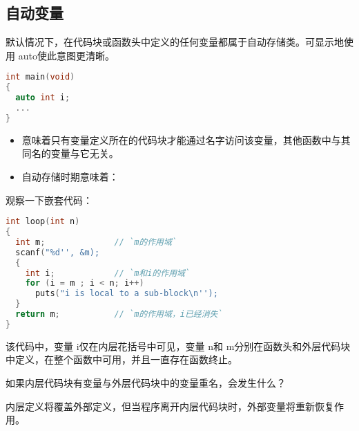 \subsection{自动变量}
\begin{frame}[fragile]\ft{\subsecname}
默认情况下，在代码块或函数头中定义的任何变量都属于自动存储类。可显示地使用{ auto}使此意图更清晰。
\begin{lstlisting}[language=c,frame=single]
int main(void)
{
  auto int i;
  ...
}  
\end{lstlisting}
\end{frame}

\begin{frame}[fragile]\ft{\subsecname}
  \begin{itemize}
  \item {}意味着只有变量定义所在的代码块才能通过名字访问该变量，其他函数中与其同名的变量与它无关。\\[0.1in]
  \item 自动存储时期意味着：
  \end{itemize}
\end{frame}

\begin{frame}[fragile]\ft{\subsecname}
观察一下嵌套代码：
\begin{lstlisting}[language=c,frame=single]
int loop(int n)
{
  int m;              // `m的作用域`
  scanf("%d'', &m);
  {
    int i;            // `m和i的作用域`
    for (i = m ; i < n; i++)
      puts("i is local to a sub-block\n'');
  }
  return m;           // `m的作用域，i已经消失`
}  
\end{lstlisting}
\end{frame}

\begin{frame}[fragile]\ft{\subsecname}
该代码中，变量{ i}仅在内层花括号中可见，变量{ n}和{ m}分别在函数头和外层代码块中定义，在整个函数中可用，并且一直存在函数终止。
\end{frame}

\begin{frame}[fragile]\ft{\subsecname}
  \begin{wenti}
    如果内层代码块有变量与外层代码块中的变量重名，会发生什么？
  \end{wenti} \pause 
  
  内层定义将覆盖外部定义，但当程序离开内层代码块时，外部变量将重新恢复作用。
\end{frame}

